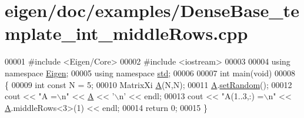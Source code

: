 \hypertarget{eigen_2doc_2examples_2_dense_base__template__int__middle_rows_8cpp_source}{}\section{eigen/doc/examples/\+Dense\+Base\+\_\+template\+\_\+int\+\_\+middle\+Rows.cpp}
\label{eigen_2doc_2examples_2_dense_base__template__int__middle_rows_8cpp_source}

\begin{DoxyCode}
00001 \textcolor{preprocessor}{#include <Eigen/Core>}
00002 \textcolor{preprocessor}{#include <iostream>}
00003 
00004 \textcolor{keyword}{using namespace }\hyperlink{namespace_eigen}{Eigen};
00005 \textcolor{keyword}{using namespace }\hyperlink{namespacestd}{std};
00006 
00007 \textcolor{keywordtype}{int} main(\textcolor{keywordtype}{void})
00008 \{
00009     \textcolor{keywordtype}{int} \textcolor{keyword}{const} N = 5;
00010     MatrixXi \hyperlink{group___core___module_class_eigen_1_1_matrix}{A}(N,N);
00011     \hyperlink{group___core___module_class_eigen_1_1_matrix}{A}.\hyperlink{class_eigen_1_1_plain_object_base_af0e576a0e1aefc9ee346de44cc352ba3}{setRandom}();
00012     cout << \textcolor{stringliteral}{"A =\(\backslash\)n"} << \hyperlink{group___core___module_class_eigen_1_1_matrix}{A} << \textcolor{charliteral}{'\(\backslash\)n'} << endl;
00013     cout << \textcolor{stringliteral}{"A(1..3,:) =\(\backslash\)n"} << \hyperlink{group___core___module_class_eigen_1_1_matrix}{A}.middleRows<3>(1) << endl;
00014     \textcolor{keywordflow}{return} 0;
00015 \}
\end{DoxyCode}
